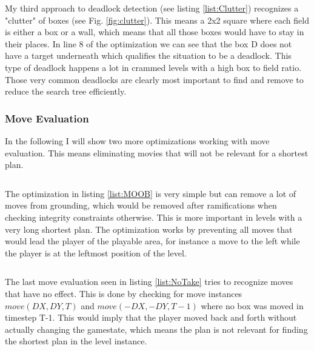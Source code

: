 \documentclass{report}
\begin{document}

\begin{lstlisting}[caption={Clutter},label=list:Clutter]
\end{lstlisting}

My third approach to deadlock detection (see listing \ref{list:Clutter}) recognizes a "clutter" of boxes (see Fig. \ref{fig:clutter}). This means a 2x2 square where each field is either a box or a wall, which means that all those boxes would have to stay in their places. In line 8 of the optimization we can see that the box D does not have a target underneath which qualifies the situation to be a deadlock. This type of deadlock happens a lot in crammed levels with a high box to field ratio. Those very common deadlocks are clearly most important to find and remove to reduce the search tree efficiently.

\subsubsection{Move Evaluation}

In the following I will show two more optimizations working with move evaluation. This means eliminating movies that will not be relevant for a shortest plan.


\begin{lstlisting}[caption={Moves out of Bounds},label=list:MOOB]
\end{lstlisting}

The optimization in listing \ref{list:MOOB} is very simple but can remove a lot of moves from grounding, which would be removed after ramifications when checking integrity constraints otherwise. This is more important in levels with a very long shortest plan. The optimization works by preventing all moves that would lead the player of the playable area, for instance a move to the left while the player is at the leftmost position of the level.


\begin{lstlisting}[caption={No Taking back Moves},label=list:NoTake]
\end{lstlisting}

The last move evaluation seen in listing \ref{list:NoTake} tries to recognize moves that have no effect. This is done by checking for move instances $move(DX,DY,T)$ and $move(-DX,-DY,T-1)$ where no box was moved in timestep T-1. This would imply that the player moved back and forth without actually changing the gamestate, which means the plan is not relevant for finding the shortest plan in the level instance.
\end{document}
